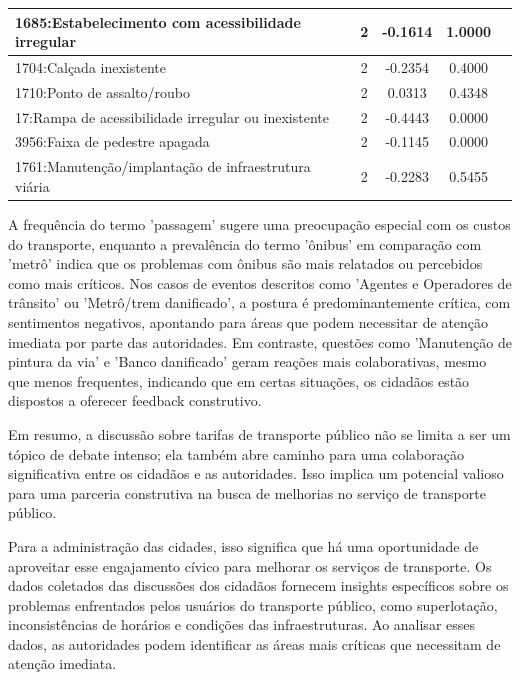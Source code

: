 \begin{table}[htbp]
\begin{tabular}{|l|c|c|c|c|}
		\hline
		1685:Estabelecimento com acessibilidade irregular    & 2                & -0.1614        & 1.0000           \\
		\hline
		1704:Calçada inexistente                             & 2                & -0.2354        & 0.4000           \\
		\hline
		1710:Ponto de assalto/roubo                          & 2                & 0.0313         & 0.4348           \\
		\hline
		17:Rampa de acessibilidade irregular ou inexistente  & 2                & -0.4443        & 0.0000           \\
		\hline
		3956:Faixa de pedestre apagada                       & 2                & -0.1145        & 0.0000           \\
		\hline
		1761:Manutenção/implantação de infraestrutura viária & 2                & -0.2283        & 0.5455           \\
		\hline
	\end{tabular}
\end{table}

A frequência do termo 'passagem' sugere uma preocupação especial com os custos do transporte, enquanto a prevalência do termo 'ônibus' em comparação com 'metrô' indica que os problemas com ônibus são mais relatados ou percebidos como mais críticos. Nos casos de eventos descritos como 'Agentes e Operadores de trânsito' ou 'Metrô/trem danificado', a postura é predominantemente crítica, com sentimentos negativos, apontando para áreas que podem necessitar de atenção imediata por parte das autoridades. Em contraste, questões como 'Manutenção de pintura da via' e 'Banco danificado' geram reações mais colaborativas, mesmo que menos frequentes, indicando que em certas situações, os cidadãos estão dispostos a oferecer feedback construtivo.

Em resumo, a discussão sobre tarifas de transporte público não se limita a ser um tópico de debate intenso; ela também abre caminho para uma colaboração significativa entre os cidadãos e as autoridades. Isso implica um potencial valioso para uma parceria construtiva na busca de melhorias no serviço de transporte público.

Para a administração das cidades, isso significa que há uma oportunidade de aproveitar esse engajamento cívico para melhorar os serviços de transporte. Os dados coletados das discussões dos cidadãos fornecem insights específicos sobre os problemas enfrentados pelos usuários do transporte público, como superlotação, inconsistências de horários e condições das infraestruturas. Ao analisar esses dados, as autoridades podem identificar as áreas mais críticas que necessitam de atenção imediata.

